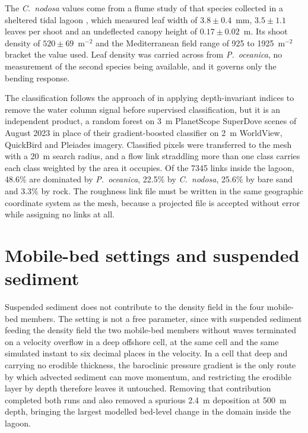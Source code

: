\documentclass[12pt]{article}
\begin{document}
The \emph{C.\ nodosa} values come from a flume study of that species collected
in a sheltered tidal lagoon \citep{Morris2008}, which measured leaf width of
$3.8 \pm 0.4$~mm, $3.5 \pm 1.1$ leaves per shoot and an undeflected canopy
height of $0.17 \pm 0.02$~m. Its shoot density of $520 \pm 69$~m$^{-2}$ and the
Mediterranean field range of 925 to 1925~m$^{-2}$ \citep{Cancemi2002} bracket
the value used. Leaf density was carried across from \emph{P.\ oceanica}, no
measurement of the second species being available, and it governs only the
bending response.

The classification follows the approach of \citet{Maltese2025} in applying
depth-invariant indices to remove the water column signal before supervised
classification, but it is an independent product, a random forest on 3~m
PlanetScope SuperDove scenes of August 2023 in place of their gradient-boosted
classifier on 2~m WorldView, QuickBird and Pleiades imagery. Classified pixels
were transferred to the mesh with a 20~m search radius, and a flow link
straddling more than one class carries each class weighted by the area it
occupies. Of the 7345 links inside the lagoon, 48.6\% are dominated by
\emph{P.\ oceanica}, 22.5\% by \emph{C.\ nodosa}, 25.6\% by bare sand and 3.3\%
by rock. The roughness link file must be written in the same geographic
coordinate system as the mesh, because a projected file is accepted without
error while assigning no links at all.

\section{Mobile-bed settings and suspended sediment}
\label{sec:s_sediment}

Suspended sediment does not contribute to the density field in the four
mobile-bed members. The setting is not a free parameter, since with suspended
sediment feeding the density field the two mobile-bed members without waves
terminated on a velocity overflow in a deep offshore cell, at the same cell and
the same simulated instant to six decimal places in the velocity. In a cell
that deep and carrying no erodible thickness, the baroclinic pressure gradient
is the only route by which advected sediment can move momentum, and
restricting the erodible layer by depth therefore leaves it untouched.
Removing that contribution completed both runs and also removed a spurious
2.4~m deposition at 500~m depth, bringing the largest modelled bed-level change
in the domain inside the lagoon.
\end{document}
